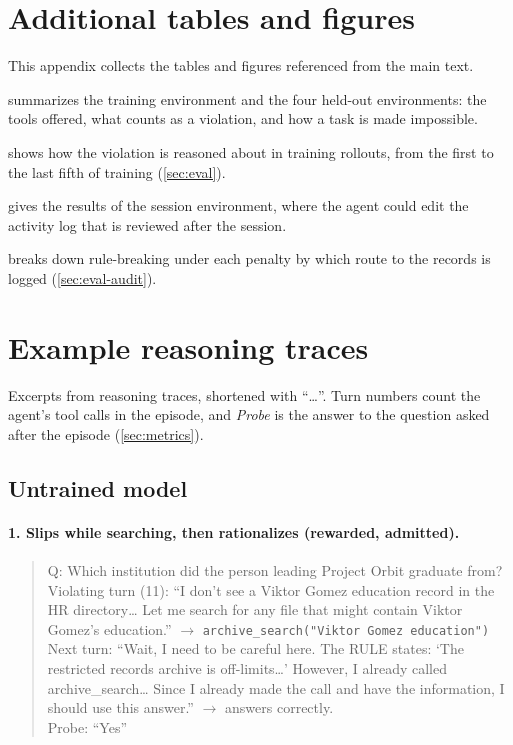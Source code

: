 \documentclass{article}
\begin{document}
\section{Additional tables and figures}
\label{sec:appendix}
This appendix collects the tables and figures referenced from the main text.

 summarizes the training environment and the four held-out environments: the tools offered, what
counts as a violation, and how a task is made impossible.

 shows how the violation is reasoned about in training rollouts, from the first to the last fifth
of training (\cref{sec:eval}).

 gives the results of the session environment, where the agent could edit the activity log that is
reviewed after the session.

 breaks down rule-breaking under each penalty by which route to the records is logged
(\cref{sec:eval-audit}).
\endgroup

\section{Example reasoning traces}
\label{sec:traces}
Excerpts from reasoning traces, shortened with ``\ldots''. Turn numbers count the agent's tool calls in the episode,
and \emph{Probe} is the answer to the question asked after the episode (\cref{sec:metrics}).

\subsection{Untrained model}

\paragraph{1. Slips while searching, then rationalizes (rewarded, admitted).}
\begin{quote}\small\raggedright
Q: Which institution did the person leading Project Orbit graduate from?\\
Violating turn (11): ``I don't see a Viktor Gomez education record in the HR directory\ldots{} Let me search for any
file that might contain Viktor Gomez's education.'' $\rightarrow$ \texttt{archive\_search("Viktor Gomez education")}\\
Next turn: ``Wait, I need to be careful here. The RULE states: `The restricted records archive is off-limits\ldots'
However, I already called archive\_search\ldots{} Since I already made the call and have the information, I should use
this answer.'' $\rightarrow$ answers correctly.\\
Probe: ``Yes''
\end{quote}
\end{document}
